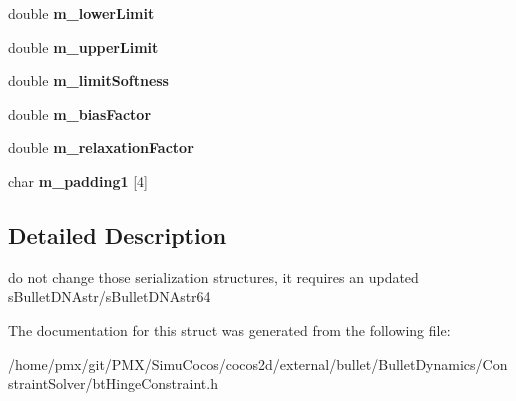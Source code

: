 \begin{DoxyCompactItemize}
double {\bfseries m\+\_\+lower\+Limit}
\item 
\mbox{\label{structbtHingeConstraintDoubleData2_a5fdda2cd7254610a65e924a9927fc101}} 
double {\bfseries m\+\_\+upper\+Limit}
\item 
\mbox{\label{structbtHingeConstraintDoubleData2_ae03225be5c3f9986816fb5096f9b63f2}} 
double {\bfseries m\+\_\+limit\+Softness}
\item 
\mbox{\label{structbtHingeConstraintDoubleData2_a0e249f5a84fefbe5e65aa703e297ea57}} 
double {\bfseries m\+\_\+bias\+Factor}
\item 
\mbox{\label{structbtHingeConstraintDoubleData2_a61f1241b2bef82c1d7a9655cca24b341}} 
double {\bfseries m\+\_\+relaxation\+Factor}
\item 
\mbox{\label{structbtHingeConstraintDoubleData2_aa6d7cd93a34d1dbc600360c2bd96c272}} 
char {\bfseries m\+\_\+padding1} \mbox{[}4\mbox{]}
\end{DoxyCompactItemize}


\subsection{Detailed Description}
do not change those serialization structures, it requires an updated s\+Bullet\+D\+N\+Astr/s\+Bullet\+D\+N\+Astr64 

The documentation for this struct was generated from the following file\+:\begin{DoxyCompactItemize}
\item 
/home/pmx/git/\+P\+M\+X/\+Simu\+Cocos/cocos2d/external/bullet/\+Bullet\+Dynamics/\+Constraint\+Solver/bt\+Hinge\+Constraint.\+h\end{DoxyCompactItemize}
